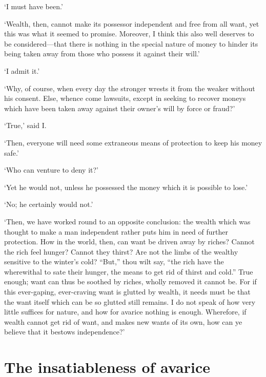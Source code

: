 \documentclass[12pt]{book}
\begin{document}
`I must have been.'

`Wealth, then, cannot make its possessor independent and free from all
want, yet this was what it seemed to promise. Moreover, I think this
also well deserves to be considered---that there is nothing in the
special nature of money to hinder its being taken away from those who
possess it against their will.'

`I admit it.'

`Why, of course, when every day the stronger wrests it from the weaker
without his consent. Else, whence come lawsuits, except in seeking to
recover moneys which have been taken away against their owner's will by
force or fraud?'

`True,' said I.

`Then, everyone will need some extraneous means of protection to keep
his money safe.'

`Who can venture to deny it?'

`Yet he would not, unless he possessed the money which it is possible to
lose.'

`No; he certainly would not.'

`Then, we have worked round to an opposite conclusion: the wealth which
was thought to make a man independent rather puts him in need of further
protection. How in the world, then, can want be driven away by riches?
Cannot the rich feel hunger? Cannot they thirst? Are not the limbs of
the wealthy sensitive to the winter's cold? ``But,'' thou wilt say, ``the
rich have the wherewithal to sate their hunger, the means to get rid of
thirst and cold.'' True enough; want can thus be soothed by riches,
wholly removed it cannot be. For if this ever-gaping, ever-craving want
is glutted by wealth, it needs must be that the want itself which can be
so glutted still remains. I do not speak of how very little suffices for
nature, and how for avarice nothing is enough. Wherefore, if wealth
cannot get rid of want, and makes new wants of its own, how can ye
believe that it bestows independence?'




\section{The insatiableness of avarice}
\end{document}

